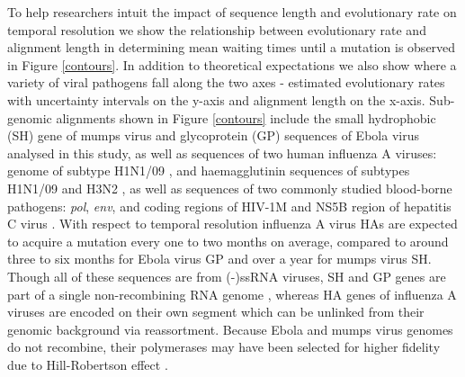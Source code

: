 \documentclass[11pt,oneside,letterpaper]{article}
\begin{document}
To help researchers intuit the impact of sequence length and evolutionary rate on temporal resolution we show the relationship between evolutionary rate and alignment length in determining mean waiting times until a mutation is observed in Figure \ref{contours}.
In addition to theoretical expectations we also show where a variety of viral pathogens fall along the two axes - estimated evolutionary rates with uncertainty intervals on the y-axis and alignment length on the x-axis.
Sub-genomic alignments shown in Figure \ref{contours} include the small hydrophobic (SH) gene of mumps virus \citep{cui_evolutionary_2017} and glycoprotein (GP) sequences of Ebola virus analysed in this study, as well as sequences of two human influenza A viruses: genome of subtype H1N1/09 \citep{hedge_real-time_2013}, and haemagglutinin sequences of subtypes H1N1/09 \citep{smith_origins_2009} and H3N2 \citep{rambaut_genomic_2008}, as well as sequences of two commonly studied blood-borne pathogens: \textit{pol}, \textit{env}, and coding regions of HIV-1M \citep{patino-galindo_substitution_2017} and NS5B region of hepatitis C virus \citep{magiorkinis_global_2009}.
With respect to temporal resolution influenza A virus HAs are expected to acquire a mutation every one to two months on average, compared to around three to six months for Ebola virus GP and over a year for mumps virus SH.
Though all of these sequences are from (-)ssRNA viruses, SH and GP genes are part of a single non-recombining RNA genome \citep{chare_phylogenetic_2003}, whereas HA genes of influenza A viruses are encoded on their own segment which can be unlinked from their genomic background via reassortment.
Because Ebola and mumps virus genomes do not recombine, their polymerases may have been selected for higher fidelity due to Hill-Robertson effect \citep{hill_effect_1966}.
\end{document}
